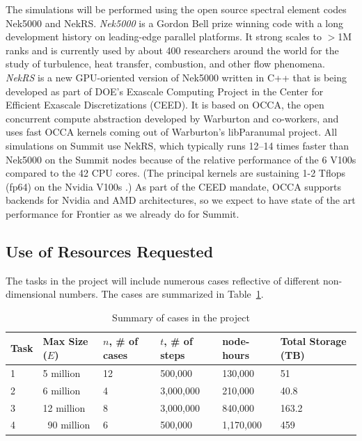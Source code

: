 \documentclass[11pt,letterpaper,english]{article}
\begin{document}
The simulations will be performed using the open source spectral element codes
Nek5000 and NekRS.   {\em Nek5000} is a Gordon Bell prize winning code with a
long development history on leading-edge parallel platforms.  It strong scales
to $>$1M ranks \cite{fischer15} and is currently used by about 400 researchers
around the world for the study of turbulence, heat transfer, combustion, and
other flow phenomena.  {\em NekRS} is a new GPU-oriented version of Nek5000
written in C++ that is being developed as part of DOE's Exascale Computing
Project in the Center for Efficient Exascale Discretizations (CEED).  It is
based on OCCA, the open concurrent compute abstraction developed by Warburton
and co-workers, and uses fast OCCA kernels coming out of Warburton's
libParanumal project.  All simulations on Summit use NekRS, which typically
runs 12--14 times faster than Nek5000 on the Summit nodes because of the
relative performance of the 6 V100s compared to the 42 CPU cores.  (The
principal kernels are sustaining 1-2 Tflops (fp64) on the Nvidia V100s
\cite{fischer20a,warburton2019}.) As part of the CEED mandate, OCCA supports
backends for Nvidia and AMD architectures, so we expect to have state of the
art performance for Frontier as we already do for Summit.

\vspace{-.25in}
\subsection{Use of Resources Requested}
\vspace{-.2in}

The tasks in the project will include numerous cases reflective of different
non-dimensional numbers. The cases are summarized in Table~\ref{tab:cases}.

\begin{table}
\centering
\caption{Summary of cases in the project}
\begin{tabular}{llllll}
\hline
\hline
Task & Max Size ($E$) &  $n$, \# of cases  & $t$, \# of steps & node-hours & Total Storage (TB)\\
\hline
\hline
1 & 5 million       & 12   & 500,000   &    130,000 & 51\\
2 & 6 million       & 4    & 3,000,000 &    210,000 & 40.8\\
3 & 12 million      & 8    & 3,000,000 &    840,000 & 163.2\\
4 & ~90 million  & 6    & 500,000   &  1,170,000 & 459\\
\hline
\hline
\end{tabular}
\label{tab:cases}
\end{table}
\end{document}
